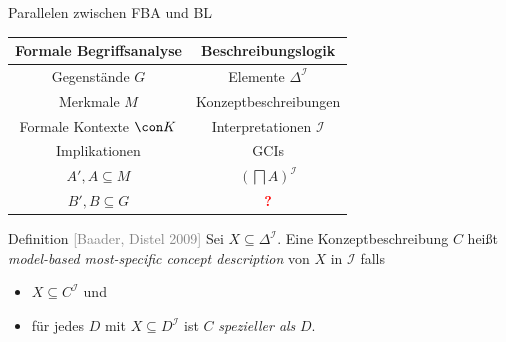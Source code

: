 \documentclass[ngerman]{beamer}
\newcommand{\pseudocite}[1]{\textcolor{gray}{[#1]}}
\begin{document}
\begin{frame}

  \onslide<+->

  \begin{block}{Parallelen zwischen FBA und BL}
    \begin{center}
      \begin{tabular}{c|c}
        Formale Begriffsanalyse & Beschreibungslogik \\
        \midrule\onslide<+->
        Gegenstände $G$ & Elemente $\Delta^{\mathcal{I}}$ \\\onslide<+->
        Merkmale $M$ & Konzeptbeschreibungen \\\onslide<+->
        Formale Kontexte $\con K$ & Interpretationen $\mathcal{I}$ \\\onslide<+->
        Implikationen & GCIs \\\onslide<+->
        $A', A \subseteq M$ & $(\bigsqcap A)^{\mathcal{I}}$ \\\onslide<+->
        $B', B \subseteq G$ & \textcolor{red}{\textbf{?}}
      \end{tabular}
    \end{center}
  \end{block}

  \onslide<+->

  \begin{block}{Definition \pseudocite{Baader, Distel 2009}}
    Sei $X \subseteq \Delta^{\mathcal{I}}$. \onslide<+-> Eine Konzeptbeschreibung $C$
    heißt \emph{model-based most-specific concept description} von $X$ in $\mathcal{I}$
    falls
    \begin{itemize}
    \item<+-> $X \subseteq C^{\mathcal{I}}$ und
    \item<+-> für jedes $D$ mit $X \subseteq D^{\mathcal{I}}$ ist $C$ \emph{spezieller
        als} $D$.
    \end{itemize}
  \end{block}

\end{frame}




  
\end{document}
